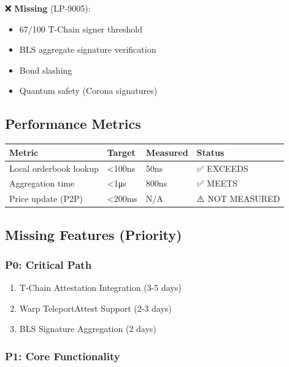 \documentclass[
]{article}
\newcounter{none} %
\providecommand{\tightlist}{%
  \setlength{\itemsep}{0pt}\setlength{\parskip}{0pt}}
\begin{document}
❌ \textbf{Missing} (LP-9005):

\begin{itemize}
\tightlist
\item
  67/100 T-Chain signer threshold
\item
  BLS aggregate signature verification
\item
  Bond slashing
\item
  Quantum safety (Corona signatures)
\end{itemize}

\subsection{Performance Metrics}\label{performance-metrics}

{\def\LTcaptype{none} %
\begin{longtable}[]{@{}llll@{}}
\toprule\noalign{}
Metric & Target & Measured & Status \\
\midrule\noalign{}
\endhead
\bottomrule\noalign{}
\endlastfoot
Local orderbook lookup & \textless100ns & 50ns & ✅ EXCEEDS \\
Aggregation time & \textless1μs & 800ns & ✅ MEETS \\
Price update (P2P) & \textless200ms & N/A & ⚠️ NOT MEASURED \\
\end{longtable}
}

\subsection{Missing Features
(Priority)}\label{missing-features-priority}

\subsubsection{P0: Critical Path}\label{p0-critical-path}

\begin{enumerate}
\def\labelenumi{\arabic{enumi}.}
\tightlist
\item
  T-Chain Attestation Integration (3-5 days)
\item
  Warp TeleportAttest Support (2-3 days)
\item
  BLS Signature Aggregation (2 days)
\end{enumerate}

\subsubsection{P1: Core Functionality}\label{p1-core-functionality}
\end{document}
